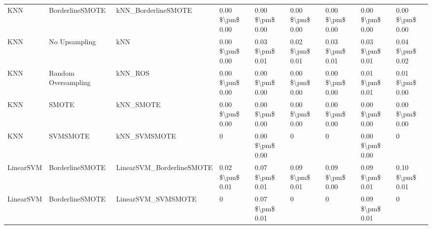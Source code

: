 \begin{tabular}{lllllllll}
                            KNN &               BorderlineSMOTE &                          kNN\_BorderlineSMOTE & 0.00 \$\textbackslash pm\$ 0.00 &           0.00 \$\textbackslash pm\$ 0.00 &       0.00 \$\textbackslash pm\$ 0.00 &        0.00 \$\textbackslash pm\$ 0.00 &                         0.00 \$\textbackslash pm\$ 0.00 & 0.00 \$\textbackslash pm\$ 0.00 \\
                            KNN &                 No Upsampling &                                          kNN & 0.00 \$\textbackslash pm\$ 0.00 &           0.03 \$\textbackslash pm\$ 0.01 &       0.02 \$\textbackslash pm\$ 0.01 &        0.03 \$\textbackslash pm\$ 0.01 &                         0.03 \$\textbackslash pm\$ 0.01 & 0.04 \$\textbackslash pm\$ 0.02 \\
                            KNN &           Random Oversampling &                                      kNN\_ROS & 0.00 \$\textbackslash pm\$ 0.00 &           0.00 \$\textbackslash pm\$ 0.00 &       0.00 \$\textbackslash pm\$ 0.00 &        0.00 \$\textbackslash pm\$ 0.00 &                         0.01 \$\textbackslash pm\$ 0.01 & 0.01 \$\textbackslash pm\$ 0.00 \\
                            KNN &                         SMOTE &                                    kNN\_SMOTE & 0.00 \$\textbackslash pm\$ 0.00 &           0.00 \$\textbackslash pm\$ 0.00 &       0.00 \$\textbackslash pm\$ 0.00 &        0.00 \$\textbackslash pm\$ 0.00 &                         0.00 \$\textbackslash pm\$ 0.00 & 0.00 \$\textbackslash pm\$ 0.00 \\
                            KNN &                      SVMSMOTE &                                 kNN\_SVMSMOTE &               0 &           0.00 \$\textbackslash pm\$ 0.00 &                     0 &                      0 &                         0.00 \$\textbackslash pm\$ 0.00 &               0 \\
                      LinearSVM &               BorderlineSMOTE &                    LinearSVM\_BorderlineSMOTE & 0.02 \$\textbackslash pm\$ 0.01 &           0.07 \$\textbackslash pm\$ 0.01 &       0.09 \$\textbackslash pm\$ 0.01 &        0.09 \$\textbackslash pm\$ 0.00 &                         0.09 \$\textbackslash pm\$ 0.01 & 0.10 \$\textbackslash pm\$ 0.01 \\
                      LinearSVM &               BorderlineSMOTE &                           LinearSVM\_SVMSMOTE &               0 &           0.07 \$\textbackslash pm\$ 0.01 &                     0 &                      0 &                         0.09 \$\textbackslash pm\$ 0.01 &               0 \\

\end{tabular}
